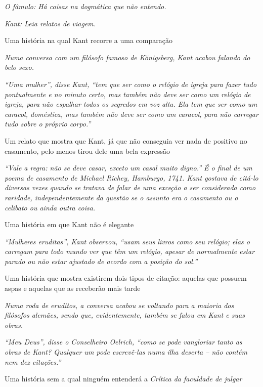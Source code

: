 \emph{O fâmulo: Há coisas na dogmática que não entendo.}

\emph{Kant: Leia relatos de viagem.}\bigskip

Uma história na qual Kant recorre a uma comparação

\emph{Numa conversa com um filósofo famoso de Königsberg, Kant acabou
falando do belo sexo.}

\emph{``Uma mulher'', disse Kant, ``tem que ser como o relógio de igreja
para fazer tudo pontualmente e no minuto certo, mas também não deve ser
como um relógio de igreja, para não espalhar todos os segredos em voz
alta. Ela tem que ser como um caracol, doméstica, mas também não deve
ser como um caracol, para não carregar tudo sobre o próprio corpo.''}\bigskip

Um relato que mostra que Kant, já que não conseguia ver nada de positivo
no casamento, pelo menos tirou dele uma bela expressão

\emph{``Vale a regra: não se deve casar, exceto um casal muito digno.''
É o final de um poema de casamento de Michael Richey, Hamburgo, 1741.
Kant gostava de citá-lo diversas vezes quando se tratava de falar de uma
exceção a ser considerada como raridade, independentemente da questão se
o assunto era o casamento ou o celibato ou ainda outra coisa.}\bigskip

Uma história em que Kant não é elegante

\emph{``Mulheres eruditas'', Kant observou, ``usam seus livros como seu
relógio; elas o carregam para todo mundo ver que têm um relógio, apesar
de normalmente estar parado ou não estar ajustado de acordo com a
posição do sol.''}\bigskip

Uma história que mostra existirem dois tipos de citação: aquelas que
possuem aspas e aquelas que as receberão mais tarde

\emph{Numa roda de eruditos, a conversa acabou se voltando para a
maioria dos filósofos alemães, sendo que, evidentemente, também se falou
em Kant e suas obras.}

\emph{``Meu Deus'', disse o Conselheiro Oelrich, ``como se pode
vangloriar tanto as obras de Kant? Qualquer um pode escrevê-las numa
ilha deserta -- não contém nem dez citações.''}\bigskip

Uma história sem a qual ninguém entenderá a \emph{Crítica da faculdade
de julgar}


